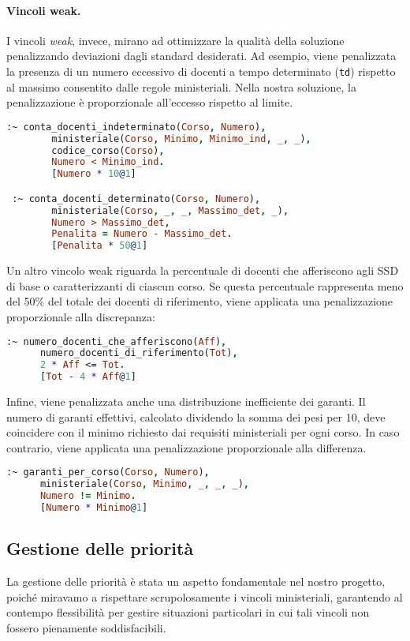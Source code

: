 \paragraph{Vincoli weak.}
I vincoli \textit{weak}, invece, mirano ad ottimizzare la qualità della soluzione penalizzando 
deviazioni dagli standard desiderati. Ad esempio, viene penalizzata la presenza di un numero eccessivo 
di docenti a tempo determinato (\texttt{td}) rispetto al massimo consentito dalle regole ministeriali. 
Nella nostra soluzione, la penalizzazione è proporzionale all'eccesso rispetto al limite.

\begin{lstlisting}[language=prolog]
 :~ conta_docenti_indeterminato(Corso, Numero),
        ministeriale(Corso, Minimo, Minimo_ind, _, _),
        codice_corso(Corso),
        Numero < Minimo_ind.
        [Numero * 10@1]

 :~ conta_docenti_determinato(Corso, Numero),
        ministeriale(Corso, _, _, Massimo_det, _),
        Numero > Massimo_det,
        Penalita = Numero - Massimo_det.
        [Penalita * 50@1]
\end{lstlisting}

Un altro vincolo weak riguarda la percentuale di docenti che afferiscono agli SSD di base o 
caratterizzanti di ciascun corso. Se questa percentuale rappresenta meno del 50\% del totale dei docenti 
di riferimento, viene applicata una penalizzazione proporzionale alla discrepanza:

\begin{lstlisting}[language=prolog]
 :~ numero_docenti_che_afferiscono(Aff), 
      numero_docenti_di_riferimento(Tot),
      2 * Aff <= Tot.
      [Tot - 4 * Aff@1]
\end{lstlisting}

Infine, viene penalizzata anche una distribuzione inefficiente dei garanti. Il numero di garanti 
effettivi, calcolato dividendo la somma dei pesi per 10, deve coincidere con il minimo richiesto 
dai requisiti ministeriali per ogni corso. In caso contrario, viene applicata una penalizzazione 
proporzionale alla differenza.

\begin{lstlisting}[language=prolog]
 :~ garanti_per_corso(Corso, Numero),
      ministeriale(Corso, Minimo, _, _, _),
      Numero != Minimo.
      [Numero * Minimo@1]
\end{lstlisting}


\subsection{Gestione delle priorità}\label{sec:priorita}
La gestione delle priorità è stata un aspetto fondamentale nel nostro progetto, poiché 
miravamo a rispettare scrupolosamente i vincoli ministeriali, garantendo al contempo 
flessibilità per gestire situazioni particolari in cui tali vincoli non fossero 
pienamente soddisfacibili.


